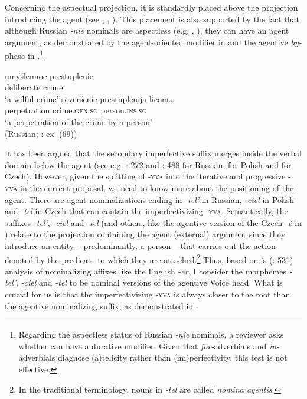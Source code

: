 \documentclass[output=paper,colorlinks,citecolor=brown]{langscibook}
\begin{document}
Concerning the aspectual projection, it is standardly placed above the projection introducing the agent (see \citealt{BabkoMalaya2003}, \citealt{Blaszcza.KlimekJankowska2012}, \citealt{Gribanova2015}). This placement is also supported by the fact that although Russian \textit{-nie} nominals are aspectless (e.g. \citealt{Schoorlemmer1995}, \citealt{bis:Gehrke2008}), they can have an agent argument, as demonstrated by the agent-oriented modifier in  and the agentive \textit{by-}phase in .\footnote{Regarding the aspectless status of Russian \textit{-nie} nominals, a reviewer asks whether  can have a durative modifier. Given that \textit{for-}adverbials and \textit{in-}adverbials diagnose (a)telicity rather than (im)perfectivity, this test is not effective.  }

\ea\label{biskup:ex:agent}\ea\gll umyšlennoe prestuplenie\\
deliberate crime\\
\glt ‘a wilful crime’ \label{biskup:ex:agent.a}
\ex\gll soveršenie prestuplenija licom{\dots} \\
perpetration crime.\textsc{gen.sg} person.\textsc{ins.sg}\\
\glt ‘a perpetration of the crime by a person’\\\hfill (Russian; \citealt{Biskup2021}%
: ex. (69)) \label{biskup:ex:agent.b}
\z\z

\noindent It has been argued that the secondary imperfective suffix merges inside the verbal domain below the agent (see e.g. \citealt{bis:Romanova2004}: 272 and \citealt{Tatevosov2015}: 488 for Russian, \citealt{bis:Kwapiszewski2022} for Polish and \citealt{Biskup2021} %
for Czech). However, given the splitting of \textsc{-yva} into the iterative and progressive \textsc{-yva} in the current proposal, we need to know more about the positioning of the agent. There are agent nominalizations ending in \textit{-tel’} in Russian, \textit{-ciel} in Polish and \textit{-tel} in Czech that can contain the imperfectivizing \textsc{-yva}. Semantically, the suffixes \textit{-tel’}, \textit{-ciel} and \textit{-tel} (and others, like the agentive version of the Czech \textit{-č} in ) relate to the projection containing the agent (external) argument since they introduce an entity -- predominantly, a person -- that carries out the action denoted by the predicate to which they are attached.\footnote{In the traditional terminology, nouns in \textit{-tel} are called \textit{nomina agentis}.} Thus, based on \citeauthor{Baker.Vinokurova2009}'s (\citeyear{Baker.Vinokurova2009}: 531) analysis of nominalizing affixes like the English \textit{-er}, I consider the morphemes \textit{-tel’}, \textit{-ciel} and \textit{-tel} to be nominal versions of the agentive Voice head. What is crucial for us is that the imperfectivizing \textsc{-yva} is always closer to the root than the agentive nominalizing suffix, as demonstrated in .
\end{document}
